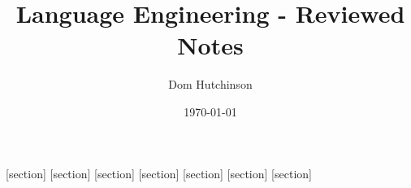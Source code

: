 \documentclass[11pt,a4paper]{article}
\begin{document}
\pagestyle{fancy}
\setlength\parindent{0pt}
\allowdisplaybreaks

[section]
[section]
[section]
[section]
[section]
[section]
[section]


\newcommand{\eg}{\textit{e.g.} }
\newcommand{\EG}{\underline{E.G.} - }
\newcommand{\ie}{\textit{i.e.} }
\newcommand{\IE}{\underline{I.E.} - }
\newcommand{\NB}{\underline{N.B.} - }
\newcommand\doubleplus{+\kern-1.3ex+\kern0.8ex} %

\newcommand{\notation}[1]{\stepcounter{notation} \textbf{Notation \arabic{section}.\arabic{notation}\ - }\textit{#1}\\}
\newcommand{\proof}[1]{\stepcounter{proof} \textbf{Proof \arabic{section}.\arabic{proof}\ - }\textit{#1}\\}
\newcommand{\proposition}[1]{\stepcounter{proposition} \textbf{Proposition \arabic{section}.\arabic{proposition}\ - }\textit{#1}\\}
\newcommand{\Proposition}[1]{\stepcounter{proposition} \textbf{Proposition \arabic{section}.\arabic{proposition}\ - }\textit{#1}}
\newcommand{\theorem}[1]{\stepcounter{theorem} \textbf{Theorem\arabic{section}.\arabic{theorem}\ - }\textit{#1}\\}

\newenvironment{definition}[1]
	{\stepcounter{definition} \textbf{Definition \arabic{section}.\arabic{definition}\ - }\textit{#1}\\}
	{}
\newenvironment{example}[1]
	{\stepcounter{example} \textbf{Example \arabic{section}.\arabic{example}\ - }\textit{#1}\\}
	{}
\newenvironment{remark}[1]
	{\stepcounter{remark} \textbf{Remark \arabic{section}.\arabic{remark}\ - }\textit{#1}\\}
	{}

\renewcommand{\headrulewidth}{0pt}

\title{Language Engineering - Reviewed Notes}
\author{Dom Hutchinson}
\date{\today}
\maketitle

\fancyhead[R]{\today}
\end{document}

